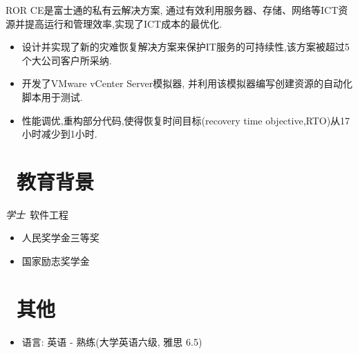 \documentclass{resume}
\begin{document}
\begin{onehalfspacing}
ROR CE是富士通的私有云解决方案, 通过有效利用服务器、存储、网络等ICT资源并提高运行和管理效率,实现了ICT成本的最优化.
\begin{itemize}
  \item 设计并实现了新的灾难恢复解决方案来保护IT服务的可持续性,该方案被超过5个大公司客户所采纳.
  \item 开发了VMware vCenter Server模拟器, 并利用该模拟器编写创建资源的自动化脚本用于测试.
  \item 性能调优,重构部分代码,使得恢复时间目标(recovery time objective,RTO)从17小时减少到1小时.
\end{itemize}
\end{onehalfspacing}


\section{\faGraduationCap\  教育背景}
\textit{学士}\ 软件工程
\begin{itemize}
  \item 人民奖学金三等奖
  \item 国家励志奖学金
\end{itemize}


\section{\faInfo\ 其他}
\begin{itemize}[parsep=0.5ex]
  \item 语言: 英语 - 熟练(大学英语六级, 雅思 6.5)
\end{itemize}

%
%
\end{document}
